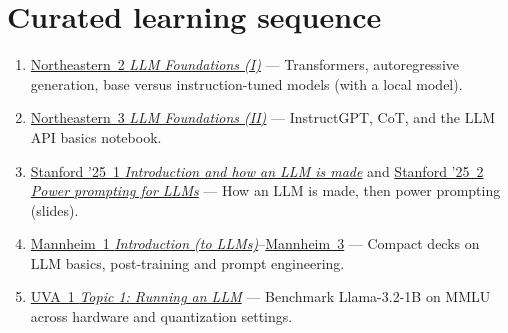 \documentclass[10pt,oneside]{report}
\begin{document}
\section{Curated learning sequence}
\begin{enumerate}
\item \hyperlink{lec-NEU-2}{Northeastern~2 \emph{LLM Foundations (I)}} --- Transformers, autoregressive generation, base versus instruction-tuned models (with a local model).
\item \hyperlink{lec-NEU-3}{Northeastern~3 \emph{LLM Foundations (II)}} --- InstructGPT, CoT, and the LLM API basics notebook.
\item \hyperlink{lec-STAN25-1}{Stanford '25~1 \emph{Introduction and how an LLM is made}} and \hyperlink{lec-STAN25-2}{Stanford '25~2 \emph{Power prompting for LLMs}} --- How an LLM is made, then power prompting (slides).
\item \hyperlink{lec-MANN-1}{Mannheim~1 \emph{Introduction (to LLMs)}}--\hyperlink{lec-MANN-3}{Mannheim~3} --- Compact decks on LLM basics, post-training and prompt engineering.
\item \hyperlink{lec-UVA-1}{UVA~1 \emph{Topic 1: Running an LLM}} --- Benchmark Llama-3.2-1B on MMLU across hardware and quantization settings.
\end{enumerate}
\end{document}
